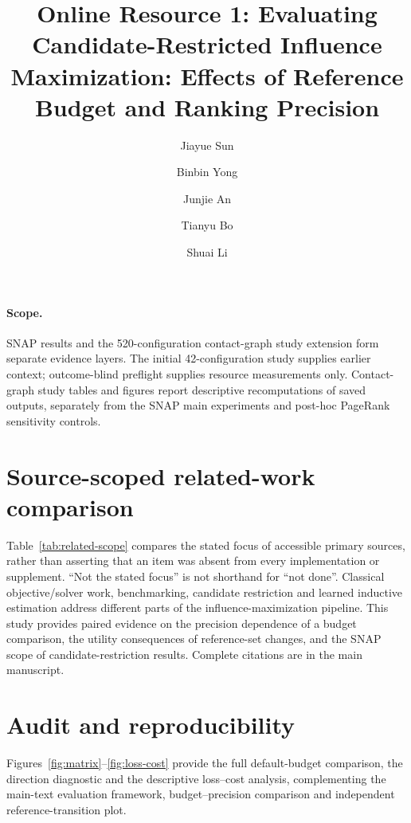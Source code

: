 \documentclass[smallextended]{svjour3}
\begin{document}
\title{Online Resource 1: Evaluating Candidate-Restricted Influence Maximization: Effects of Reference Budget and Ranking Precision}
\author{Jiayue Sun \and Binbin Yong \and Junjie An \and Tianyu Bo \and Shuai Li}
\date{}\maketitle
\paragraph{Scope.} SNAP results and the 520-configuration contact-graph study extension form separate evidence layers. The initial 42-configuration study supplies earlier context; outcome-blind preflight supplies resource measurements only. Contact-graph study tables and figures report descriptive recomputations of saved outputs, separately from the SNAP main experiments and post-hoc PageRank sensitivity controls.

\section{Source-scoped related-work comparison}
Table~\ref{tab:related-scope} compares the stated focus of accessible primary
sources, rather than asserting that an item was absent from every implementation
or supplement. ``Not the stated focus'' is not shorthand for ``not done''.
Classical objective/solver work, benchmarking, candidate restriction and learned
inductive estimation address different parts of the influence-maximization
pipeline. This study provides paired evidence on the precision dependence of a
budget comparison, the utility consequences of reference-set changes, and the
SNAP scope of candidate-restriction results. Complete citations are in the
main manuscript.


\section{Audit and reproducibility}
Figures~\ref{fig:matrix}--\ref{fig:loss-cost} provide the full default-budget
comparison, the direction diagnostic and the descriptive loss--cost analysis,
complementing the main-text evaluation framework, budget--precision comparison
and independent reference-transition plot.
\end{document}
